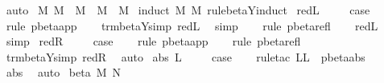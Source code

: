 \begin{isabellebody}
\ auto%
\endisatagproof
{\isafoldproof}%
%
\isadelimproof
\isanewline
%
\endisadelimproof
\isanewline
{}\isamarkupfalse%
\ M{}{\isacharprime}{\isacharcolon}\ {\isachardoublequoteopen}M\ {\isasymRightarrow}\ M{\isacharprime}\ {\isasymLongrightarrow}\ M\ {\isasymggreater}\ M{\isacharprime}{\isachardoublequoteclose}\isanewline
%
\isadelimproof
%
\endisadelimproof
%
\isatagproof
{}\isamarkupfalse%
\ {\isacharparenleft}induct\ M\ M{\isacharprime}\ rule{\isacharcolon}beta{\isacharunderscore}Y{\isachardot}induct{\isacharparenright}\isanewline
{}\isamarkupfalse%
\ red{\isacharunderscore}L\ \isanewline
\ \ \isamarkupfalse%
\ {\isacharquery}case\isanewline
\ \ \isamarkupfalse%
\ {\isacharparenleft}rule\ pbeta{\isachardot}app{\isacharparenright}\isanewline
\ \ \isamarkupfalse%
\ trm{\isacharunderscore}beta{\isacharunderscore}Y{\isacharunderscore}simp{}\ red{\isacharunderscore}L\ \isamarkupfalse%
\ simp\isanewline
\ \ \isamarkupfalse%
\ {\isacharparenleft}rule\ pbeta{\isacharunderscore}refl{\isacharparenright}\isanewline
\ \ \isamarkupfalse%
\ red{\isacharunderscore}L\ \isamarkupfalse%
\ simp\isanewline
{}\isamarkupfalse%
\isanewline
{}\isamarkupfalse%
\ red{\isacharunderscore}R\ \isanewline
\ \ \isamarkupfalse%
\ {\isacharquery}case\isanewline
\ \ \isamarkupfalse%
\ {\isacharparenleft}rule\ pbeta{\isachardot}app{\isacharparenright}\isanewline
\ \ \isamarkupfalse%
\ {\isacharparenleft}rule\ pbeta{\isacharunderscore}refl{\isacharparenright}\isanewline
\ \ \isamarkupfalse%
\ trm{\isacharunderscore}beta{\isacharunderscore}Y{\isacharunderscore}simp{}\ red{\isacharunderscore}R\ \isamarkupfalse%
\ auto\isanewline
{}\isamarkupfalse%
\isanewline
{}\isamarkupfalse%
\ {\isacharparenleft}abs\ L{\isacharparenright}\ \isanewline
\ \ \isamarkupfalse%
\ {\isacharquery}case\isanewline
\ \ \isamarkupfalse%
\ {\isacharparenleft}rule{\isacharunderscore}tac\ L{\isacharequal}L\ \ pbeta{\isachardot}abs{\isacharparenright}\isanewline
\ \ \isamarkupfalse%
\ abs\ \isamarkupfalse%
\ auto\isanewline
{}\isamarkupfalse%
\isanewline
{}\isamarkupfalse%
\ {\isacharparenleft}beta\ M\ N{\isacharparenright}\isanewline
\ \ \isamarkupfalse%

\end{isabellebody}

